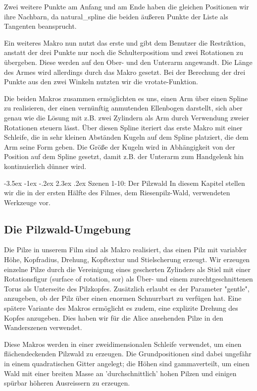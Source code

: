 \documentclass[twocolumn]{article}
\makeatletter
\renewcommand\section{\@startsection{section}{1}{\z@}%
                                      {-3.5ex \@plus -1ex \@minus -.2ex}%
                                      {2.3ex \@plus.2ex}%
                                      {\normalfont\large\bfseries}}
\makeatother
\begin{document}
Zwei weitere Punkte am Anfang und am Ende haben die gleichen Positionen wir ihre Nachbarn, da natural\_spline die beiden äußeren Punkte der Liste als Tangenten beansprucht. %

Ein weiteres Makro nun nutzt das erste und gibt dem Benutzer die Restriktion, anstatt der drei Punkte nur noch die Schulterpositiom und zwei Rotationen zu übergeben.
Diese werden auf den Ober- und den Unterarm angewandt. Die Länge des Armes wird allerdings durch das Makro gesetzt.
Bei der Berechung der drei Punkte aus den zwei Winkeln nutzten wir die vrotate-Funktion.

Die beiden Makros zusammen ermöglichten es uns, einen Arm über einen Spline zu realisieren, der einen vernünftig anmutenden Ellenbogen darstellt, sich aber genau wie die Lösung mit z.B. zwei Zylindern als Arm durch Verwendung zweier Rotationen steuern lässt.
Über diesen Spline iteriert das erste Makro mit einer Schleife, die in sehr kleinen Abständen Kugeln auf dem Spline platziert, die dem Arm seine Form geben.
Die Größe der Kugeln wird in Abhängigkeit von der Position auf dem Spline gesetzt, damit z.B. der Unterarm zum Handgelenk hin kontinuierlich dünner wird.

\section{Szenen 1-10: Der Pilzwald}
In diesem Kapitel stellen wir die in der ersten Hälfte des Filmes, dem Riesenpilz-Wald, verwendeten Werkzeuge vor.

\subsection{Die Pilzwald-Umgebung}
Die Pilze in unserem Film sind als Makro realisiert, das einen Pilz mit variabler Höhe, Kopfradius, Drehung, Kopftextur und Stielscherung erzeugt. Wir erzeugen einzelne Pilze durch die Vereinigung eines gescherten Zylinders als Stiel mit einer Rotationsfigur (surface of rotation, sor) als Über- und einem zurechtgeschnittenen Torus als Unterseite des Pilzkopfes.
Zusätzlich erlaubt es der Parameter "gentle", anzugeben, ob der Pilz über einen enormen Schnurrbart zu verfügen hat.
Eine spätere Variante des Makros ermöglicht es zudem, eine explizite Drehung des Kopfes anzugeben. Dies haben wir für die Alice ansehenden Pilze in den Wanderszenen verwendet.

Diese Makros werden in einer zweidimensionalen Schleife verwendet, um einen flächendeckenden Pilzwald zu erzeugen. Die Grundpositionen sind dabei ungefähr in einem quadratischen Gitter angelegt; die Höhen sind gammaverteilt, um einen Wald mit einer breiten Masse an 'durchschnittlich' hohen Pilzen und einigen spürbar höheren Ausreissern zu erzeugen.
\end{document}
